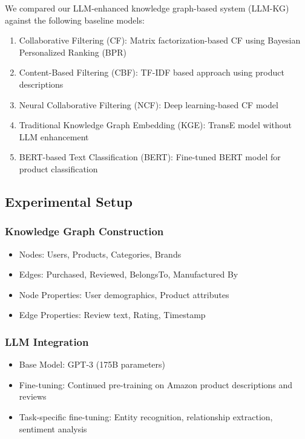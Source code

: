 \documentclass{article}
\begin{document}
We compared our LLM-enhanced knowledge graph-based system (LLM-KG) against the following baseline models:
\begin{enumerate}
    \item Collaborative Filtering (CF): Matrix factorization-based CF using Bayesian Personalized Ranking (BPR)
    \item Content-Based Filtering (CBF): TF-IDF based approach using product descriptions
    \item Neural Collaborative Filtering (NCF): Deep learning-based CF model
    \item Traditional Knowledge Graph Embedding (KGE): TransE model without LLM enhancement
    \item BERT-based Text Classification (BERT): Fine-tuned BERT model for product classification
\end{enumerate}

\subsection{Experimental Setup}

\subsubsection{Knowledge Graph Construction}
\begin{itemize}
    \item Nodes: Users, Products, Categories, Brands
    \item Edges: Purchased, Reviewed, BelongsTo, Manufactured By
    \item Node Properties: User demographics, Product attributes
    \item Edge Properties: Review text, Rating, Timestamp
\end{itemize}

\subsubsection{LLM Integration}
\begin{itemize}
    \item Base Model: GPT-3 (175B parameters)
    \item Fine-tuning: Continued pre-training on Amazon product descriptions and reviews
    \item Task-specific fine-tuning: Entity recognition, relationship extraction, sentiment analysis
\end{itemize}
\end{document}
